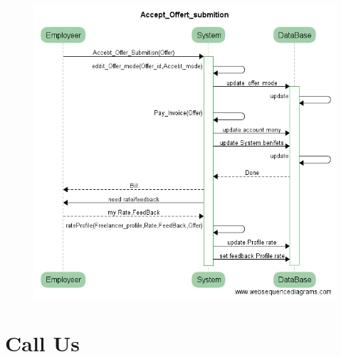 \documentclass{article}
\begin{document}
\begin{figure}[ht!]
\centering
\includegraphics[width=128mm]{Accept_Offert_submition_usecase.png}
\end{figure}



\section{Call Us}
\end{document}
